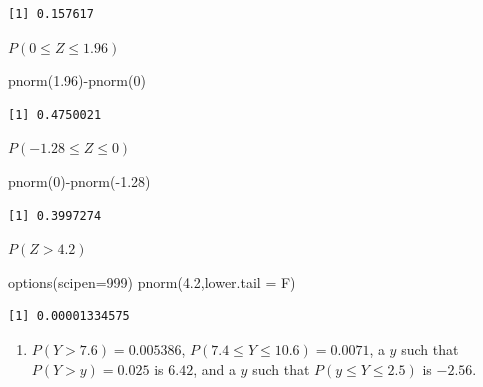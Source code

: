 \documentclass[
  letterpaper,
  DIV=11,
  numbers=noendperiod]{scrreprt}
\newenvironment{Shaded}{\begin{snugshade}}{\end{snugshade}}
\newcommand{\AttributeTok}[1]{\textcolor[rgb]{0.40,0.45,0.13}{#1}}
\newcommand{\DecValTok}[1]{\textcolor[rgb]{0.68,0.00,0.00}{#1}}
\newcommand{\FloatTok}[1]{\textcolor[rgb]{0.68,0.00,0.00}{#1}}
\newcommand{\FunctionTok}[1]{\textcolor[rgb]{0.28,0.35,0.67}{#1}}
\newcommand{\NormalTok}[1]{\textcolor[rgb]{0.00,0.23,0.31}{#1}}
\newcommand{\SpecialCharTok}[1]{\textcolor[rgb]{0.37,0.37,0.37}{#1}}
\providecommand{\tightlist}{%
  \setlength{\itemsep}{0pt}\setlength{\parskip}{0pt}}\usepackage{longtable,booktabs,array}
\begin{document}
\begin{verbatim}
[1] 0.157617
\end{verbatim}

\(P(0 \leq Z \leq 1.96)\)

\begin{Shaded}
\begin{Highlighting}[numbers=left,,]
\FunctionTok{pnorm}\NormalTok{(}\FloatTok{1.96}\NormalTok{)}\SpecialCharTok{{-}}\FunctionTok{pnorm}\NormalTok{(}\DecValTok{0}\NormalTok{)}
\end{Highlighting}
\end{Shaded}

\begin{verbatim}
[1] 0.4750021
\end{verbatim}

\(P(-1.28 \leq Z \leq 0)\)

\begin{Shaded}
\begin{Highlighting}[numbers=left,,]
\FunctionTok{pnorm}\NormalTok{(}\DecValTok{0}\NormalTok{)}\SpecialCharTok{{-}}\FunctionTok{pnorm}\NormalTok{(}\SpecialCharTok{{-}}\FloatTok{1.28}\NormalTok{)}
\end{Highlighting}
\end{Shaded}

\begin{verbatim}
[1] 0.3997274
\end{verbatim}

\(P(Z > 4.2)\)

\begin{Shaded}
\begin{Highlighting}[numbers=left,,]
\FunctionTok{options}\NormalTok{(}\AttributeTok{scipen=}\DecValTok{999}\NormalTok{)}
\FunctionTok{pnorm}\NormalTok{(}\FloatTok{4.2}\NormalTok{,}\AttributeTok{lower.tail =}\NormalTok{ F)}
\end{Highlighting}
\end{Shaded}

\begin{verbatim}
[1] 0.00001334575
\end{verbatim}

\begin{blackbox}

\begin{enumerate}
\def\labelenumi{\arabic{enumi}.}
\setcounter{enumi}{1}
\tightlist
\item
  \(P(Y>7.6)=0.005386\), \(P(7.4 \leq Y \leq 10.6)=0.0071\), a \(y\)
  such that \(P(Y>y)=0.025\) is \(6.42\), and a \(y\) such that
  \(P(y \leq Y \leq 2.5)\) is \(-2.56\).
\end{enumerate}

\end{blackbox}
\end{document}
